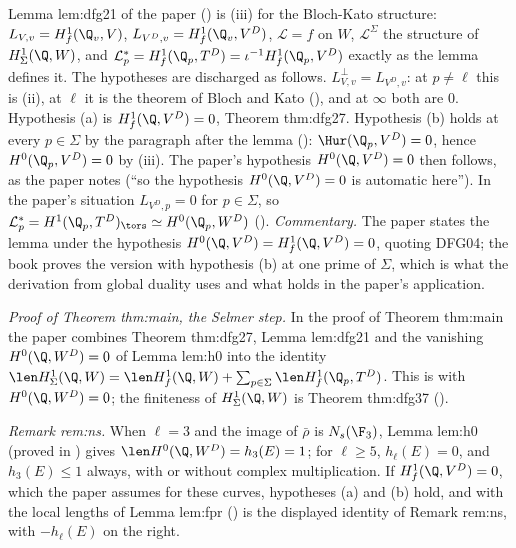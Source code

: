\begin{paperlink}\label{pl:galcoh:dfg21}
Lemma lem:dfg21 of the paper (\cite[Lemma 2.1]{DFG04}) is (iii) for the Bloch-Kato structure: $L_{V,v}=H^1_f(\Q_v,V)$, $L_{V^D,v}=H^1_f(\Q_v,V^D)$,
$\mathcal L=f$ on $W$, $\mathcal L^\Sigma$ the structure of $H^1_\Sigma(\Q,W)$, and $\mathcal L^*_p=H^1_f(\Q_p,T^D)=\iota^{-1}H^1_f(\Q_p,V^D)$ exactly as the lemma defines it. The hypotheses are discharged as
follows. $L_{V,v}^\perp=L_{V^D,v}$: at $p\ne\ell$ this is (ii), at $\ell$ it is the theorem of Bloch and Kato (), and at $\infty$ both
are $0$. Hypothesis (a) is $H^1_f(\Q,V^D)=0$, Theorem thm:dfg27. Hypothesis (b) holds at every $p\in\Sigma$ by the paragraph after the lemma
(): $\Hur(\Q_p,V^D)=0$, hence $H^0(\Q_p,V^D)=0$ by (iii). The paper's hypothesis $H^0(\Q,V^D)=0$ then
follows, as the paper notes (``so the hypothesis $H^0(\Q,V^D)=0$ is automatic here''). In the paper's situation $L_{V^D,p}=0$ for $p\in\Sigma$, so
$\mathcal L^*_p=H^1(\Q_p,T^D)_{\tors}\simeq H^0(\Q_p,W^D)$ (). \emph{Commentary.} The paper states the lemma under the hypothesis
$H^0(\Q,V^D)=H^1_f(\Q,V^D)=0$, quoting DFG04; the book proves the version with hypothesis (b) at one prime of $\Sigma$, which is what the derivation from global duality uses
and what holds in the paper's application.

\emph{Proof of Theorem thm:main, the Selmer step.} In the proof of Theorem thm:main the paper combines Theorem thm:dfg27, Lemma lem:dfg21 and the vanishing
$H^0(\Q,W^D)=0$ of Lemma lem:h0 into the identity $\len H^1_\Sigma(\Q,W)=\len H^1_f(\Q,W)+\sum_{p\in\Sigma}\len H^1_f(\Q_p,T^D)$. This is  with
$H^0(\Q,W^D)=0$; the finiteness of $H^1_\Sigma(\Q,W)$ is Theorem thm:dfg37 ().

\emph{Remark rem:ns.} When $\ell=3$ and the image of $\bar\rho$ is $N_s(\F_3)$, Lemma lem:h0 (proved in ) gives $\len H^0(\Q,W^D)=h_3(E)=1$; for $\ell\ge5$,
$h_\ell(E)=0$, and $h_3(E)\le1$ always, with or without complex multiplication. If $H^1_f(\Q,V^D)=0$, which the paper assumes for these curves, hypotheses (a) and (b) hold,
and  with the local lengths of Lemma lem:fpr () is the displayed identity of Remark rem:ns, with $-h_\ell(E)$ on the right.
\end{paperlink}

